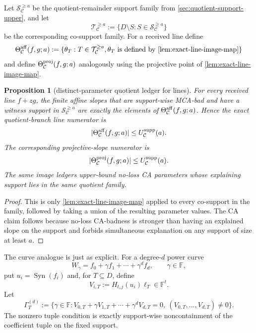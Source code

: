 \documentclass[11pt]{article}
\newtheorem{proposition}[theorem]{Proposition}
\theoremstyle{definition}
\theoremstyle{remark}
\newcommand{\F}{\mathbb{F}}
\newcommand{\Syn}{\operatorname{Syn}}
\begin{document}
Let $\mathcal S_{\mathcal C}^{\ge a}$ be the quotient-remainder support family
from \cref{sec:quotient-support-upper}, and let
\[
        \mathcal T_{\mathcal C}^{\ge a}
        :=\{D\setminus S:S\in\mathcal S_{\mathcal C}^{\ge a}\}
\]
be the corresponding co-support family.  For a received line define
\[
        \Theta_{\mathcal C}^{\rm aff}(f,g;a)
        :=\{\theta_T:T\in\mathcal T_{\mathcal C}^{\ge a},
              \theta_T\text{ is defined by }\cref{lem:exact-line-image-map}\}
\]
and define $\Theta_{\mathcal C}^{\rm proj}(f,g;a)$ analogously using the
projective point of \cref{lem:exact-line-image-map}.

\begin{proposition}[distinct-parameter quotient ledger for lines]
\label{prop:distinct-parameter-line-ledger}
For every received line $f+zg$, the finite affine slopes that are support-wise
MCA-bad and have a witness support in
$\mathcal S_{\mathcal C}^{\ge a}$ are exactly the elements of
$\Theta_{\mathcal C}^{\rm aff}(f,g;a)$.  Hence the exact quotient-branch line
numerator is
\[
        |\Theta_{\mathcal C}^{\rm aff}(f,g;a)|
        \le U_{\mathcal C}^{\rm supp}(a).
\]
The corresponding projective-slope numerator is
\[
        |\Theta_{\mathcal C}^{\rm proj}(f,g;a)|
        \le U_{\mathcal C}^{\rm supp}(a).
\]
The same image ledgers upper-bound no-loss CA parameters whose explaining
support lies in the same quotient family.
\end{proposition}

\begin{proof}
This is only \cref{lem:exact-line-image-map} applied to every co-support in the
family, followed by taking a union of the resulting parameter values.  The CA
claim follows because no-loss CA-badness is stronger than having an explained
slope on the support and forbids simultaneous explanation on any support of size
at least $a$.
\end{proof}

The curve analogue is just as explicit.  For a degree-$d$ power curve
\[
        W_\gamma=f_0+\gamma f_1+\cdots+\gamma^d f_d,
        \qquad \gamma\in\F,
\]
put $u_i=\Syn(f_i)$ and, for $T\subseteq D$, define
\[
        V_{i,T}:=H_{t,j}(u_i)\boldsymbol\ell_T\in\F^t .
\]
Let
\[
        \Gamma_T^{(d)}
        :=\{\gamma\in\F:
             V_{0,T}+\gamma V_{1,T}+\cdots+\gamma^dV_{d,T}=0,
             \ (V_{0,T},\ldots,V_{d,T})\ne0\} .
\]
The nonzero tuple condition is exactly support-wise noncontainment of the
coefficient tuple on the fixed support.
\end{document}
